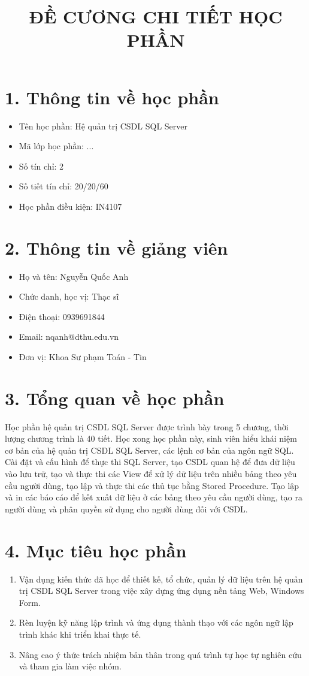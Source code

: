 \documentclass[a4paper,12pt]{article}
\title{ĐỀ CƯƠNG CHI TIẾT HỌC PHẦN}
\author{}
\date{}
\begin{document}
\maketitle

\section*{1. Thông tin về học phần}
\begin{itemize}
    \item Tên học phần: Hệ quản trị CSDL SQL Server
    \item Mã lớp học phần: ...
    \item Số tín chỉ: 2
    \item Số tiết tín chỉ: 20/20/60
    \item Học phần điều kiện: IN4107
\end{itemize}

\section*{2. Thông tin về giảng viên}
\begin{itemize}
    \item Họ và tên: Nguyễn Quốc Anh
    \item Chức danh, học vị: Thạc sĩ
    \item Điện thoại: 0939691844
    \item Email: nqanh@dthu.edu.vn
    \item Đơn vị: Khoa Sư phạm Toán - Tin
\end{itemize}

\section*{3. Tổng quan về học phần}
Học phần hệ quản trị CSDL SQL Server được trình bày trong 5 chương, thời lượng chương trình là 40 tiết. Học xong học phần này, sinh viên hiểu khái niệm cơ bản của hệ quản trị CSDL SQL Server, các lệnh cơ bản của ngôn ngữ SQL. Cài đặt và cấu hình để thực thi SQL Server, tạo CSDL quan hệ để đưa dữ liệu vào lưu trữ, tạo và thực thi các View để xử lý dữ liệu trên nhiều bảng theo yêu cầu người dùng, tạo lập và thực thi các thủ tục bằng Stored Procedure. Tạo lập và in các báo cáo để kết xuất dữ liệu ở các bảng theo yêu cầu người dùng, tạo ra người dùng và phân quyền sử dụng cho người dùng đối với CSDL.

\section*{4. Mục tiêu học phần}
\begin{enumerate}[label=4.\arabic*.]
    \item Vận dụng kiến thức đã học để thiết kế, tổ chức, quản lý dữ liệu trên hệ quản trị CSDL SQL Server trong việc xây dựng ứng dụng nền tảng Web, Windows Form.
    \item Rèn luyện kỹ năng lập trình và ứng dụng thành thạo với các ngôn ngữ lập trình khác khi triển khai thực tế.
    \item Nâng cao ý thức trách nhiệm bản thân trong quá trình tự học tự nghiên cứu và tham gia làm việc nhóm.
\end{enumerate}
\end{document}
